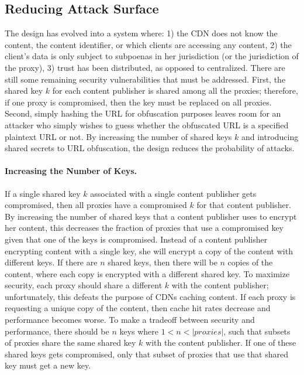 \subsection{Reducing Attack Surface}
The design has evolved into a system where: 1) the CDN does not know the content, the content identifier, 
or which clients are accessing any content, 2) the client's data is only subject to subpoenas in her jurisdiction 
(or the jurisdiction of the proxy), 3) trust has been distributed, as opposed to centralized.  There are still 
some remaining security vulnerabilities that must be addressed.  First, the shared key $k$ for each content 
publisher is shared among all the proxies; therefore, if one proxy is compromised, then the key must be replaced 
on all proxies.  Second, simply hashing the URL for obfuscation purposes leaves room for an attacker who simply 
wishes to guess whether the obfuscated URL is a specified plaintext URL or not.  By increasing the number of shared 
keys $k$ and introducing shared secrets to URL obfuscation, the design reduces the probability of attacks.

\paragraph{Increasing the Number of Keys.} If a single shared key $k$ associated with a single content publisher gets 
compromised, then all proxies have a compromised $k$ for that content publisher.  By increasing the number of shared 
keys that a content publisher uses to encrypt her content, this decreases the fraction of proxies that use a 
compromised key given that one of the keys is compromised.  Instead of a content publisher encrypting content with a 
single key, she will encrypt a copy of the content with different keys.  If there are $n$ shared keys, then there 
will be $n$ copies of the content, where each copy is encrypted with a different shared key.  To maximize security, each proxy should share a
different $k$ with the content publisher; unfortunately, this defeats the purpose of CDNs caching content.  If each 
proxy is requesting a unique copy of the content, then cache hit rates decrease and performance becomes worse.  To make 
a tradeoff between security and performance, there should be $n$ keys where $1 < n < |proxies|$, such that subsets of 
proxies share the same shared key $k$ with the content publisher.  If one of these shared keys gets compromised, only that 
subset of proxies that use that shared key must get a new key.  

